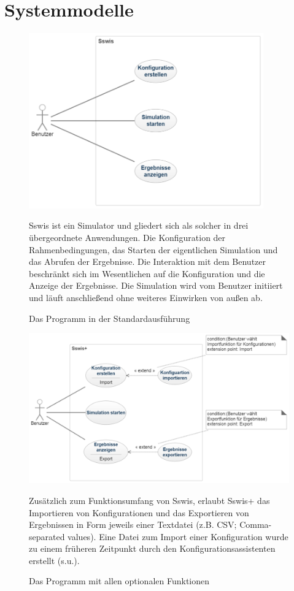 \section{Systemmodelle}
\begin{figure}[htbp]
{\centering 
\includegraphics[width=0.9\textwidth]{Anwendungsfalldiagramme/usecase_sswis.png}
\caption{Das Programm in der Standardausführung} }
\bigskip
Sswis ist ein Simulator und gliedert sich als solcher in drei übergeordnete Anwendungen. Die Konfiguration der Rahmenbedingungen, das Starten der eigentlichen Simulation und das Abrufen der Ergebnisse. Die Interaktion mit dem Benutzer beschränkt sich im Wesentlichen auf die Konfiguration und die Anzeige der Ergebnisse. Die Simulation wird vom Benutzer initiiert und läuft anschließend ohne weiteres Einwirken von außen ab.

\end{figure}
\begin{figure}[htbp]
{\centering
\includegraphics[width=1.1\textwidth]{Anwendungsfalldiagramme/usecase_sswis+.png}
\caption{Das Programm mit allen optionalen Funktionen} }
\bigskip

Zusätzlich zum Funktionsumfang von Sswis, erlaubt Sswis+ das Importieren von Konfigurationen und das Exportieren von Ergebnissen in Form jeweils einer Textdatei (z.B. CSV; Comma-separated values). Eine Datei zum Import einer Konfiguration wurde zu einem früheren Zeitpunkt durch den Konfigurationsassistenten erstellt (s.u.).

\end{figure}
